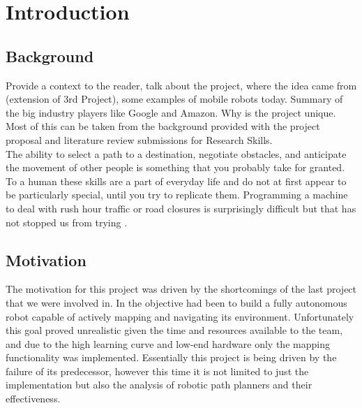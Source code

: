 \chapter{Introduction}


\section{Background}

\noindent
Provide a context to the reader, talk about the project, where the idea came from (extension of 3rd Project), some examples of mobile robots today. Summary of the big industry players like Google and Amazon. Why is the project unique. Most of this can be taken from the background provided with the project proposal and literature review submissions for Research Skills.\\

\noindent
The ability to select a path to a destination, negotiate obstacles, and anticipate the movement of other people is something that you probably take for granted. To a human these skills are a part of everyday life and do not at first appear to be particularly special, until you try to replicate them. Programming a machine to deal with rush hour traffic or road closures is surprisingly difficult but that has not stopped us from trying \cite{MIT}.\\

\newpage


\section{Motivation}

\noindent
The motivation for this project was driven by the shortcomings of the last project \cite{JMD14} that we were involved in. In \cite{JMD14} the objective had been to build a fully autonomous robot capable of actively mapping and navigating its environment. Unfortunately this goal proved unrealistic given the time and resources available to the team, and due to the high learning curve and low-end hardware only the mapping functionality was implemented. Essentially this project is being driven by the failure of its predecessor, however this time it is not limited to just the implementation but also the analysis of robotic path planners and their effectiveness. \\

